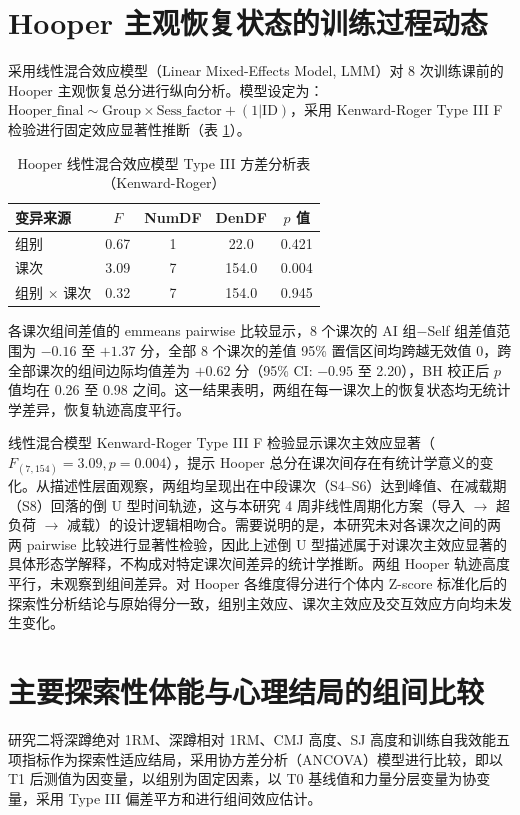 \documentclass[UTF8,zihao=-4,twoside,openany]{ctexbook}
\begin{document}
\section{Hooper 主观恢复状态的训练过程动态}
采用线性混合效应模型（Linear Mixed-Effects Model, LMM）对 8 次训练课前的 Hooper 主观恢复总分进行纵向分析。模型设定为：$\text{Hooper\_final} \sim \text{Group} \times \text{Sess\_factor} + (1|\text{ID})$，采用 Kenward-Roger Type III F 检验进行固定效应显著性推断（表 \ref{tab:ch4-hooper}）。

\begin{table}[htbp]
  \centering
  \caption{Hooper 线性混合效应模型 Type III 方差分析表（Kenward-Roger）}
  \label{tab:ch4-hooper}
  \vspace{6pt}
  \small
  \begin{tabularx}{\textwidth}{lcccc}
    \toprule
    \textbf{变异来源} & \textbf{$F$} & \textbf{NumDF} & \textbf{DenDF} & \textbf{$p$ 值} \\
    \midrule
    组别 & 0.67 & 1 & 22.0 & 0.421 \\
    课次 & 3.09 & 7 & 154.0 & 0.004 \\
    组别 $\times$ 课次 & 0.32 & 7 & 154.0 & 0.945 \\
    \bottomrule
  \end{tabularx}
\end{table}

各课次组间差值的 emmeans pairwise 比较显示，8 个课次的 AI 组$-$Self 组差值范围为 $-0.16$ 至 $+1.37$ 分，全部 8 个课次的差值 95\% 置信区间均跨越无效值 0，跨全部课次的组间边际均值差为 $+0.62$ 分（95\% CI: $-0.95$ 至 2.20），BH 校正后 $p$ 值均在 0.26 至 0.98 之间。这一结果表明，两组在每一课次上的恢复状态均无统计学差异，恢复轨迹高度平行。

线性混合模型 Kenward-Roger Type III F 检验显示课次主效应显著（$F_{(7,154)} = 3.09, p = 0.004$），提示 Hooper 总分在课次间存在有统计学意义的变化。从描述性层面观察，两组均呈现出在中段课次（S4--S6）达到峰值、在减载期（S8）回落的倒 U 型时间轨迹，这与本研究 4 周非线性周期化方案（导入 $\rightarrow$ 超负荷 $\rightarrow$ 减载）的设计逻辑相吻合。需要说明的是，本研究未对各课次之间的两两 pairwise 比较进行显著性检验，因此上述倒 U 型描述属于对课次主效应显著的具体形态学解释，不构成对特定课次间差异的统计学推断。两组 Hooper 轨迹高度平行，未观察到组间差异。对 Hooper 各维度得分进行个体内 Z-score 标准化后的探索性分析结论与原始得分一致，组别主效应、课次主效应及交互效应方向均未发生变化。

\section{主要探索性体能与心理结局的组间比较}
研究二将深蹲绝对 1RM、深蹲相对 1RM、CMJ 高度、SJ 高度和训练自我效能五项指标作为探索性适应结局，采用协方差分析（ANCOVA）模型进行比较，即以 T1 后测值为因变量，以组别为固定因素，以 T0 基线值和力量分层变量为协变量，采用 Type III 偏差平方和进行组间效应估计。
\end{document}
